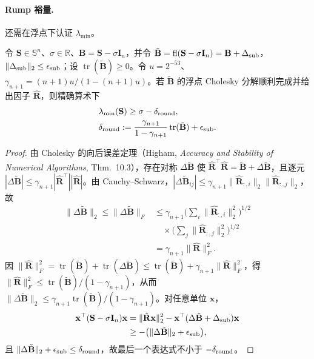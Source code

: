 \paragraph{Rump 裕量.} 还需在浮点下认证 $\lambda_{\min}$。
\begin{lemma}\label{lem:rump}
令 $\mathbf S\in\mathbb S^n$、$\sigma\in\mathbb R$、$\mathbf B=\mathbf S-\sigma\mathbf I_n$，并令 $\tilde{\mathbf B}=\operatorname{fl}(\mathbf S-\sigma\mathbf I_n)=\mathbf B+\Delta_{\rm sub}$，$\|\Delta_{\rm sub}\|_2\le\epsilon_{\rm sub}$；设 $\operatorname{tr}(\tilde{\mathbf B})\ge0$。令 $u=2^{-53}$、$\gamma_{n+1}=(n+1)u/(1-(n+1)u)$。若 $\tilde{\mathbf B}$ 的浮点 Cholesky 分解顺利完成并给出因子 $\hat{\mathbf R}$，则精确算术下
\begin{equation}
\begin{aligned}
&\lambda_{\min}(\mathbf S)\ge\sigma-\delta_{\rm round},\\
&\delta_{\rm round}:=\frac{\gamma_{n+1}}{1-\gamma_{n+1}}\operatorname{tr}(\tilde{\mathbf B})+\epsilon_{\rm sub}.
\end{aligned}
\label{eq:rump}
\end{equation}
\end{lemma}
\begin{proof}
由 Cholesky 的向后误差定理（Higham, \emph{Accuracy and Stability of Numerical Algorithms}, Thm.~10.3），存在对称 $\Delta\tilde{\mathbf B}$ 使 $\hat{\mathbf R}^\top\hat{\mathbf R}=\tilde{\mathbf B}+\Delta\tilde{\mathbf B}$，且逐元 $|\Delta\tilde{\mathbf B}|\le\gamma_{n+1}|\hat{\mathbf R}^\top||\hat{\mathbf R}|$。由 Cauchy--Schwarz，$|\Delta\tilde{\mathbf B}_{ij}|\le\gamma_{n+1}\|\hat{\mathbf R}_{:,i}\|_2\|\hat{\mathbf R}_{:,j}\|_2$，故
\begin{equation}
\begin{aligned}
\|\Delta\tilde{\mathbf B}\|_2\le\|\Delta\tilde{\mathbf B}\|_F
&\le\gamma_{n+1}\Big(\sum_i\|\hat{\mathbf R}_{:,i}\|_2^2\Big)^{1/2}\\
&\quad\times\Big(\sum_j\|\hat{\mathbf R}_{:,j}\|_2^2\Big)^{1/2}\\
&=\gamma_{n+1}\|\hat{\mathbf R}\|_F^2 .
\end{aligned}
\end{equation}
因 $\|\hat{\mathbf R}\|_F^2=\operatorname{tr}(\tilde{\mathbf B})+\operatorname{tr}(\Delta\tilde{\mathbf B})\le\operatorname{tr}(\tilde{\mathbf B})+\gamma_{n+1}\|\hat{\mathbf R}\|_F^2$，得 $\|\hat{\mathbf R}\|_F^2\le\operatorname{tr}(\tilde{\mathbf B})/(1-\gamma_{n+1})$，从而 $\|\Delta\tilde{\mathbf B}\|_2\le\gamma_{n+1}\operatorname{tr}(\tilde{\mathbf B})/(1-\gamma_{n+1})$。对任意单位 $\mathbf x$，
\begin{equation}
\begin{aligned}
\mathbf x^\top(\mathbf S-\sigma\mathbf I_n)\mathbf x
&=\|\hat{\mathbf R}\mathbf x\|_2^2-\mathbf x^\top(\Delta\tilde{\mathbf B}+\Delta_{\rm sub})\mathbf x\\
&\ge-\big(\|\Delta\tilde{\mathbf B}\|_2+\epsilon_{\rm sub}\big),
\end{aligned}
\end{equation}
且 $\|\Delta\tilde{\mathbf B}\|_2+\epsilon_{\rm sub}\le\delta_{\rm round}$，故最后一个表达式不小于 $-\delta_{\rm round}$。
\end{proof}

